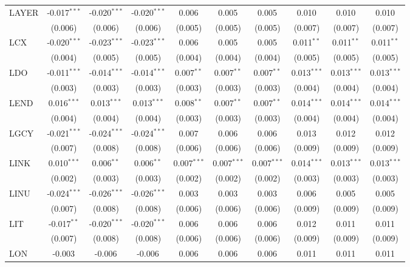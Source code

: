 \begin{table}[!htbp]
\begin{tabular}{@{\extracolsep{5pt}}lccccccccc}
 LAYER & -0.017$^{***}$ & -0.020$^{***}$ & -0.020$^{***}$ & 0.006$^{}$ & 0.005$^{}$ & 0.005$^{}$ & 0.010$^{}$ & 0.010$^{}$ & 0.010$^{}$ \\
  & (0.006) & (0.006) & (0.006) & (0.005) & (0.005) & (0.005) & (0.007) & (0.007) & (0.007) \\
 LCX & -0.020$^{***}$ & -0.023$^{***}$ & -0.023$^{***}$ & 0.006$^{}$ & 0.005$^{}$ & 0.005$^{}$ & 0.011$^{**}$ & 0.011$^{**}$ & 0.011$^{**}$ \\
  & (0.004) & (0.005) & (0.005) & (0.004) & (0.004) & (0.004) & (0.005) & (0.005) & (0.005) \\
 LDO & -0.011$^{***}$ & -0.014$^{***}$ & -0.014$^{***}$ & 0.007$^{**}$ & 0.007$^{**}$ & 0.007$^{**}$ & 0.013$^{***}$ & 0.013$^{***}$ & 0.013$^{***}$ \\
  & (0.003) & (0.003) & (0.003) & (0.003) & (0.003) & (0.003) & (0.004) & (0.004) & (0.004) \\
 LEND & 0.016$^{***}$ & 0.013$^{***}$ & 0.013$^{***}$ & 0.008$^{**}$ & 0.007$^{**}$ & 0.007$^{**}$ & 0.014$^{***}$ & 0.014$^{***}$ & 0.014$^{***}$ \\
  & (0.004) & (0.004) & (0.004) & (0.003) & (0.003) & (0.003) & (0.004) & (0.004) & (0.004) \\
 LGCY & -0.021$^{***}$ & -0.024$^{***}$ & -0.024$^{***}$ & 0.007$^{}$ & 0.006$^{}$ & 0.006$^{}$ & 0.013$^{}$ & 0.012$^{}$ & 0.012$^{}$ \\
  & (0.007) & (0.008) & (0.008) & (0.006) & (0.006) & (0.006) & (0.009) & (0.009) & (0.009) \\
 LINK & 0.010$^{***}$ & 0.006$^{**}$ & 0.006$^{**}$ & 0.007$^{***}$ & 0.007$^{***}$ & 0.007$^{***}$ & 0.014$^{***}$ & 0.013$^{***}$ & 0.013$^{***}$ \\
  & (0.002) & (0.003) & (0.003) & (0.002) & (0.002) & (0.002) & (0.003) & (0.003) & (0.003) \\
 LINU & -0.024$^{***}$ & -0.026$^{***}$ & -0.026$^{***}$ & 0.003$^{}$ & 0.003$^{}$ & 0.003$^{}$ & 0.006$^{}$ & 0.005$^{}$ & 0.005$^{}$ \\
  & (0.007) & (0.008) & (0.008) & (0.006) & (0.006) & (0.006) & (0.009) & (0.009) & (0.009) \\
 LIT & -0.017$^{**}$ & -0.020$^{***}$ & -0.020$^{***}$ & 0.006$^{}$ & 0.006$^{}$ & 0.006$^{}$ & 0.012$^{}$ & 0.011$^{}$ & 0.011$^{}$ \\
  & (0.007) & (0.008) & (0.008) & (0.006) & (0.006) & (0.006) & (0.009) & (0.009) & (0.009) \\
 LON & -0.003$^{}$ & -0.006$^{}$ & -0.006$^{}$ & 0.006$^{}$ & 0.006$^{}$ & 0.006$^{}$ & 0.011$^{}$ & 0.011$^{}$ & 0.011$^{}$ \\

\end{tabular}
\end{table}

